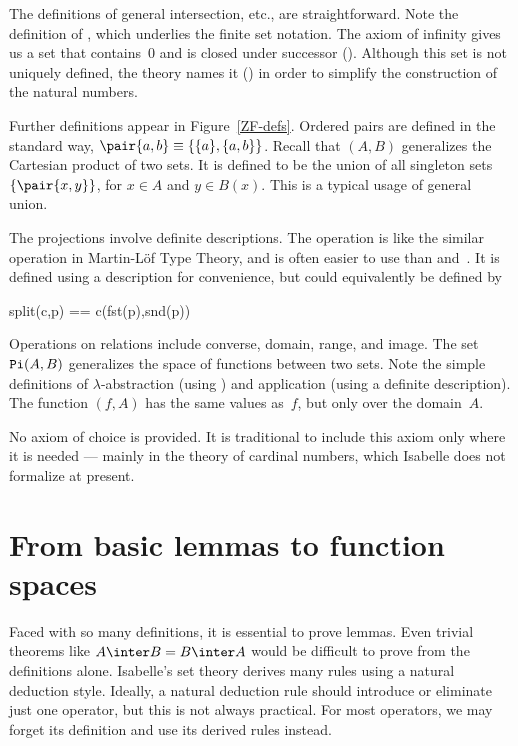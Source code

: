 The definitions of general intersection, etc., are straightforward.  Note
the definition of , which underlies the finite set notation.
The axiom of infinity gives us a set that contains~0 and is closed under
successor ().  Although this set is not uniquely defined,
the theory names it () in order to simplify the
construction of the natural numbers.
                                             
Further definitions appear in Figure~\ref{ZF-defs}.  Ordered pairs are
defined in the standard way, $\pair{a,b}\equiv\{\{a\},\{a,b\}\}$.  Recall
that $(A,B)$ generalizes the Cartesian product of two
sets.  It is defined to be the union of all singleton sets
$\{\pair{x,y}\}$, for $x\in A$ and $y\in B(x)$.  This is a typical usage of
general union.

The projections involve definite descriptions.  The 
operation is like the similar operation in Martin-L\"of Type Theory, and is
often easier to use than  and~.  It is defined
using a description for convenience, but could equivalently be defined by
\begin{ttbox}
split(c,p) == c(fst(p),snd(p))
\end{ttbox}  
Operations on relations include converse, domain, range, and image.  The
set ${\tt Pi}(A,B)$ generalizes the space of functions between two sets.
Note the simple definitions of $\lambda$-abstraction (using
) and application (using a definite description).  The
function $(f,A)$ has the same values as~$f$, but only
over the domain~$A$.

No axiom of choice is provided.  It is traditional to include this axiom
only where it is needed --- mainly in the theory of cardinal numbers, which
Isabelle does not formalize at present.


\section{From basic lemmas to function spaces}
Faced with so many definitions, it is essential to prove lemmas.  Even
trivial theorems like $A\inter B=B\inter A$ would be difficult to prove
from the definitions alone.  Isabelle's set theory derives many rules using
a natural deduction style.  Ideally, a natural deduction rule should
introduce or eliminate just one operator, but this is not always practical.
For most operators, we may forget its definition and use its derived rules
instead.

